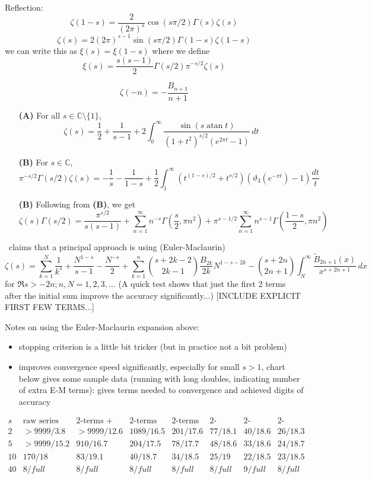 \documentclass[10pt,dvipdfmx,letterpaper,twoside]{article}
\DeclareMathOperator{\atan}{atan}
\newcommand{\CC}{{\mathbb{C}}}
\newenvironment{implementation}{\noindent\begin{framed}}{\end{framed}}
\let\Gam=\Gamma
\let\theta=\vartheta
\begin{document}
Reflection:
\[ \zeta(1-s) = \frac{2}{(2\pi)^s}\cos(s\pi/2)\Gam(s)\zeta(s) \]
\[ \zeta(s) = 2(2\pi)^{s-1}\sin(s\pi/2)\Gam(1-s)\zeta(1-s) \]
we can write this as $\xi(s) = \xi(1-s)$ where we define
\[ \xi(s) = \frac{s(s-1)}{2}\Gam(s/2)\pi^{-s/2}\zeta(s) \]

\[ \zeta(-n) = -\frac{B_{n+1}}{n+1} \]

\begin{implementation}
\begin{itemize}
\item[\bf(A)] For all $s\in\CC\setminus\{1\}$,
  \[ \zeta(s) = \frac12 + \frac{1}{s-1} + 2\int_0^\infty\frac{\sin(s \atan t)}{(1+t^2)^{s/2}(e^{2\pi t}-1)}\,dt \]
\item[\bf(B)] For $s\in\CC$,
  \[ \pi^{-s/2}\Gam(s/2)\zeta(s) = -\frac{1}{s} - \frac{1}{1-s} + \frac12\int_1^\infty(t^{(1-s)/2}+t^{s/2})(\theta_3(e^{-\pi t})-1)\frac{dt}{t} \]
\item[\bf(B)] Following from {\bf(B)}, we get
  \[ \zeta(s)\Gam(s/2) = \frac{\pi^{s/2}}{s(s-1)} + \sum_{n=1}^\infty n^{-s}\Gam(\frac{s}{2}, \pi n^2)
      + \pi^{s-1/2}\sum_{n=1}^\infty n^{s-1}\Gam(\frac{1-s}{2}, \pi n^2) \]
\end{itemize}

\cite{DLMF}~claims that a principal approach is using (Euler-Maclaurin)
\[ \zeta(s) = \sum_{k=1}^N\frac{1}{k^s} + \frac{N^{1-s}}{s-1} - \frac{N^{-s}}{2} + \sum_{k=1}^n\binom{s+2k-2}{2k-1}\frac{B_{2k}}{2k} N^{1-s-2k}
    - \binom{s+2n}{2n+1}\int_N^\infty\frac{\widetilde{B}_{2n+1}(x)}{x^{s+2n+1}}\,dx \]
for $\Re s>-2n; n,N=1,2,3,\dots$  (A quick test shows that just the first 2 terms after the initial sum improve the accuracy significantly...)
[INCLUDE EXPLICIT FIRST FEW TERMS...]

Notes on using the Euler-Maclaurin expansion above:
\begin{itemize}
\item stopping criterion is a little bit tricker (but in practice not a bit problem)
\item improves convergence speed significantly, especially for small $s>1$, chart below gives some sample data
    (running with long doubles, indicating number of extra E-M terms): gives terms needed to convergence and achieved digits of accuracy
\end{itemize}
\end{implementation}
{\small
\[\begin{array}{c|ccccccc} 
s&\text{raw series}&\text{2-terms + n=0}&\text{2-terms + n=1}&\text{2-terms + n=2}&\text{2-terms + n=3}&\text{2-terms + n=4}&\text{2-terms + n=5}\\\hline
2  & >9999/3.8 & >9999/12.6 & 1089/16.5 & 201/17.6 & 77/18.1 & 40/18.6 & 26/18.3 \\
5  & >9999/15.2 & 910/16.7 & 204/17.5 & 78/17.7 & 48/18.6 & 33/18.6 & 24/18.7 \\
10 & 170/18 & 83/19.1 & 40/18.7 & 34/18.5 & 25/19 & 22/18.5 & 23/18.5 \\
40 & 8/full & 8/full & 8/full & 8/full & 8/full & 9/full & 8/full
\end{array}\]
}
\end{document}
